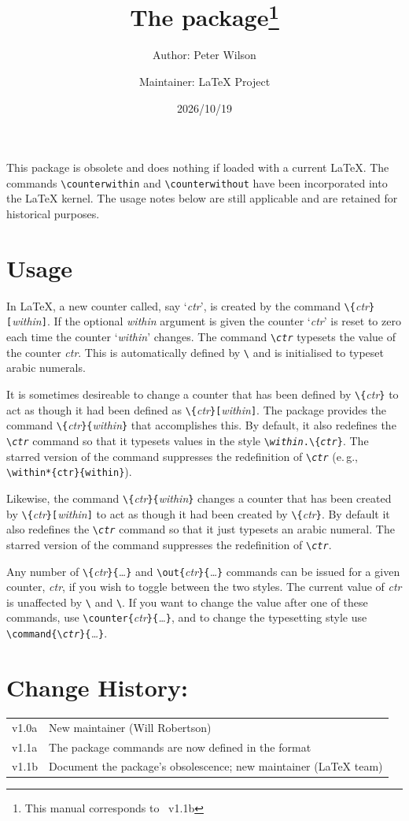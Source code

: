 \documentclass[DIV=7, pagesize=auto]{scrartcl}
\title{The \pkg{chngcntr} package\thanks{This manual corresponds to \pkg{chngcntr}~v1.1b}}
\author{Author: Peter Wilson\and Maintainer: \LaTeX{} Project}
\date{2026/10/19}
\makeatletter
\newcommand*{\cs}[1]{\texttt{\textbackslash#1}}
\newcommand*{\cmd}[1]{\cs{\expandafter\@gobble\string#1}}
\newcommand*{\meta}[1]{\textlangle\textsl{#1}\textrangle}
\newcommand*{\marg}[1]{\texttt{\{}\meta{#1}\texttt{\}}}
\newcommand*{\oarg}[1]{\texttt{[}\meta{#1}\texttt{]}}
\newcommand*{\ml}[1]{\leavevmode\marginline{\small#1}\ignorespaces}
\makeatother
\begin{document}
\maketitle

This package is obsolete and does nothing if loaded with a current \LaTeX.
The commands \cs{counterwithin} and \cs{counterwithout} have been incorporated
into the \LaTeX{} kernel. The usage notes below are still applicable and are retained
for historical purposes.

\section{Usage}

In \LaTeX, a new counter called, say `\meta{ctr}', is created by the command
\cmd{\newcounter}\marg{ctr}\oarg{within}. If the optional \meta{within} argument is given
the counter `\meta{ctr}' is reset to zero each time the counter `\meta{within}'
changes. The command \cmd{\the\meta{ctr}} typesets the value of the counter \meta{ctr}.
This is automatically defined by \cmd{\newcounter} and is initialised
to typeset arabic numerals.	

\ml{\cmd{\counterwithin}\\\cmd{\counterwithin*}}
It is sometimes desireable to change a counter that has been defined
by \cmd{\newcounter}\marg{ctr} to act as though it had been defined as
\cmd{\newcounter}\marg{ctr}\oarg{within}. The package provides the command
\cmd{\counterwithin}\marg{ctr}\marg{within} that accomplishes this. By default,
it also redefines the \cmd{\the\meta{ctr}} command so that it typesets values
in the style \texttt{\cmd{\the\meta{within}}.\cmd{\arabic}\marg{ctr}}. The starred version of the
command suppresses the redefinition of \cmd{\the\meta{ctr}}
(e.\,g., \cmd{\counter\-within*}\verb+{ctr}{within}+).

\ml{\cmd{\counterwithout}\\\cmd{\counterwithout*}}
Likewise, the command \cmd{\counterwithout}\marg{ctr}\marg{within} changes a
counter that has been created by \cmd{\newcounter}\marg{ctr}\oarg{within} to act
as though it had been created by \cmd{\newcounter}\marg{ctr}. By default it
also redefines the \cmd{\the\meta{ctr}} command so that it just typesets an arabic
numeral. The starred version of the command suppresses the redefinition
of \cmd{\the\meta{ctr}}.

Any number of \cmd{\counterwithin}\marg{ctr}\marg{\ldots} and \cmd{\counterwith\-out}\marg{ctr}\marg{\ldots}
commands can be issued for a given counter, \meta{ctr}, if you wish to toggle
between the two styles. The current value of \meta{ctr} is unaffected by
\cmd{\counterwithin} and \cmd{\counterwithout}. If you want to change the value
after one of these commands, use \cmd{\set\-counter}\marg{ctr}\marg{\ldots}, and to change
the typesetting style use \cmd{\renew\-command}\texttt{\{}\cmd{\the\meta{ctr}}\texttt{\}}\marg{\ldots}.


\section{Change History:}

\begin{tabular}{@{}l@{ -- }l@{}}
  v1.0a & New maintainer (Will Robertson)\\
  v1.1a & The package commands are now defined in the format\\
  v1.1b & Document the package's obsolescence; new maintainer (\LaTeX{} team)
\end{tabular}
\end{document}
